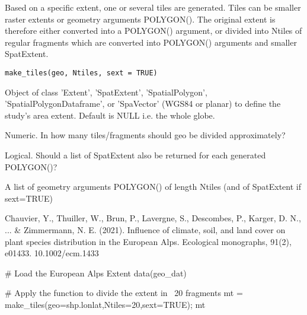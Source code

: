 \documentclass[a4paper]{book}
\begin{document}
%
\begin{Description}\relax
Based on a specific extent, one or several tiles are generated. Tiles can be smaller
raster extents or geometry arguments POLYGON(). The original extent is therefore either
converted into a POLYGON() argument, or divided into Ntiles of regular fragments which are
converted into POLYGON() arguments and smaller SpatExtent.
\end{Description}
%
\begin{Usage}
\begin{verbatim}
make_tiles(geo, Ntiles, sext = TRUE)
\end{verbatim}
\end{Usage}
%
\begin{Arguments}
\begin{ldescription}
\item[\code{geo}] Object of class 'Extent', 'SpatExtent', 'SpatialPolygon', 'SpatialPolygonDataframe',
or 'SpaVector' (WGS84 or planar) to define the study's area extent. Default is NULL i.e. the
whole globe.

\item[\code{Ntiles}] Numeric. In how many tiles/fragments should geo be divided approximately?

\item[\code{sext}] Logical. Should a list of SpatExtent also be returned for each generated POLYGON()?
\end{ldescription}
\end{Arguments}
%
\begin{Value}
A list of geometry arguments POLYGON() of length Ntiles (and of SpatExtent
if sext=TRUE)
\end{Value}
%
\begin{References}\relax
Chauvier, Y., Thuiller, W., Brun, P., Lavergne, S., Descombes, P., Karger, D. N., ... \& Zimmermann,
N. E. (2021). Influence of climate, soil, and land cover on plant species distribution in the
European Alps. Ecological monographs, 91(2), e01433. 10.1002/ecm.1433
\end{References}
%
\begin{Examples}
\begin{ExampleCode}

# Load the European Alps Extent
data(geo_dat)

# Apply the function to divide the extent in ~20 fragments
mt = make_tiles(geo=shp.lonlat,Ntiles=20,sext=TRUE); mt
\end{ExampleCode}
\end{Examples}
\end{document}
